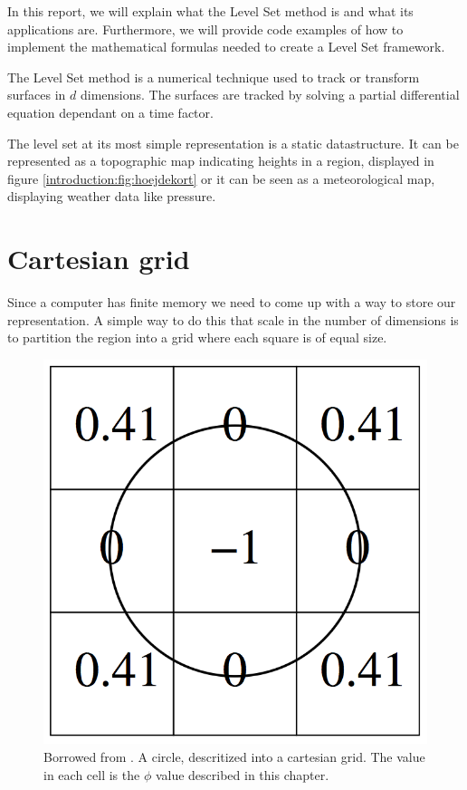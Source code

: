 In this report, we will explain what the Level Set method is and what its applications are. Furthermore, we will provide code examples of how to implement the mathematical formulas needed to create a Level Set framework. 

The Level Set method is a numerical technique used to track or transform surfaces in $d$ dimensions. The surfaces are tracked by solving a partial differential equation dependant on a time factor. 

The level set at its most simple representation is a static datastructure. It can be represented as a topographic map indicating heights in a region, displayed in figure \vref{introduction:fig:hoejdekort} or it can be seen as a meteorological map, displaying weather data like pressure.



\section*{Cartesian grid}

Since a computer has finite memory we need to come up with a way to store our representation. A simple way to do this that scale in the number of dimensions is to partition the region into a grid where each square is of equal size.

\begin{figure}[htb]
  \centering
  \includegraphics[scale=0.3]{imgs/cartesiangrid.png}
  \caption{Borrowed from . A circle, descritized into a cartesian grid. The value in each cell is the $\phi$ value described in this chapter.}
  \label{introduction:fig:cartesiangrid}
\end{figure}

